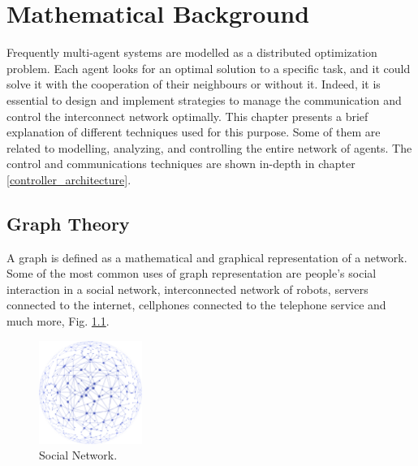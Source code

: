 \chapter{Mathematical Background}

Frequently multi-agent systems are modelled as a distributed optimization problem. Each agent looks for an optimal solution to a specific task, and it could solve it with the cooperation of their neighbours or without it. Indeed, it is essential to design and implement strategies to manage the communication and control the interconnect network optimally. This chapter presents a brief explanation of different techniques used for this purpose. Some of them are related to modelling, analyzing, and controlling the entire network of agents. The control and communications techniques are shown in-depth in chapter \ref{controller_architecture}. 
\\


\section{Graph Theory}
\label{sec:game_theory}



A graph is defined as a mathematical and graphical representation of a network. Some of the most common uses of graph representation are people's social interaction in a social network, interconnected network of robots, servers connected to the internet, cellphones connected to the telephone service and much more, Fig.  \ref{fig:Social_net}.


\begin{figure}[h]
\begin{center}
    \includegraphics[width=0.3\textwidth]{Kap2/Network.png}
    \caption{Social Network.}
    \label{fig:Social_net}
\end{center}
\end{figure}



